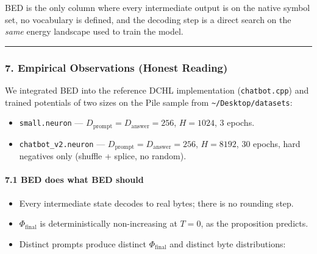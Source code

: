 \documentclass[
  11pt,
  a4paper,
]{article}
\providecommand{\tightlist}{%
  \setlength{\itemsep}{0pt}\setlength{\parskip}{0pt}}
\begin{document}
BED is the only column where every intermediate output is on the native
symbol set, no vocabulary is defined, and the decoding step is a direct
search on the \emph{same} energy landscape used to train the model.

\begin{center}\rule{0.5\linewidth}{0.5pt}\end{center}

\subsubsection{7. Empirical Observations (Honest
Reading)}\label{empirical-observations-honest-reading}

We integrated BED into the reference DCHL implementation
(\texttt{chatbot.cpp}) and trained potentials of two sizes on the Pile
sample from \texttt{\textasciitilde{}/Desktop/datasets}:

\begin{itemize}
\tightlist
\item
  \texttt{small.neuron} ---
  \(D_{\text{prompt}} = D_{\text{answer}} = 256\), \(H = 1024\), 3
  epochs.
\item
  \texttt{chatbot\_v2.neuron} ---
  \(D_{\text{prompt}} = D_{\text{answer}} = 256\), \(H = 8192\), 30
  epochs, hard negatives only (shuffle + splice, no random).
\end{itemize}

\paragraph{7.1 BED does what BED should}\label{bed-does-what-bed-should}

\begin{itemize}
\tightlist
\item
  Every intermediate state decodes to real bytes; there is no rounding
  step.
\item
  \(\Phi_{\text{final}}\) is deterministically non-increasing at
  \(T = 0\), as the proposition predicts.
\item
  Distinct prompts produce distinct \(\Phi_{\text{final}}\) and distinct
  byte distributions:
\end{itemize}
\end{document}
